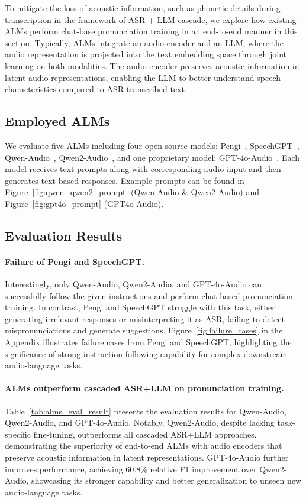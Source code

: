 \documentclass[11pt]{article}
\begin{document}
To mitigate the loss of acoustic information, such as phonetic details during transcription in the framework of ASR + LLM cascade, we explore how existing ALMs perform chat-base pronunciation training in an end-to-end manner in this section. Typically, ALMs integrate an audio encoder and an LLM, where the audio representation is projected into the text embedding space through joint learning on both modalities. The audio encoder preserves acoustic information in latent audio representations, enabling the LLM to better understand speech characteristics compared to ASR-transcribed text. 

\subsection{Employed ALMs}
We evaluate five ALMs including four open-source models: Pengi~\cite{pengi}, SpeechGPT~\cite{speechgpt}, Qwen-Audio~\cite{qwen-audio-1}, Qwen2-Audio~\cite{qwen-audio-2}, and one proprietary model: GPT-4o-Audio~\cite{gpt-4o}. Each model receives text prompts along with corresponding audio input and then generates text-based responses. Example prompts can be found in Figure~\ref{fig:qwen_qwen2_prompt} (Qwen-Audio \& Qwen2-Audio) and Figure~\ref{fig:gpt4o_prompt} (GPT4o-Audio).


\subsection{Evaluation Results} 

\paragraph{Failure of Pengi and SpeechGPT.} Interestingly, only Qwen-Audio, Qwen2-Audio, and GPT-4o-Audio can successfully follow the given instructions and perform chat-based pronunciation training. In contrast, Pengi and SpeechGPT struggle with this task, either generating irrelevant responses or misinterpreting it as ASR, failing to detect mispronunciations and generate suggestions. Figure~\ref{fig:failure_cases} in the Appendix illustrates failure cases from Pengi and SpeechGPT, highlighting the significance of strong instruction-following capability for complex downstream audio-language tasks.


\paragraph{ALMs outperform cascaded ASR+LLM on pronunciation training.} Table~\ref{tab:alms_eval_result} presents the evaluation results for Qwen-Audio, Qwen2-Audio, and GPT-4o-Audio. Notably, Qwen2-Audio, despite lacking task-specific fine-tuning, outperforms all cascaded ASR+LLM approaches, demonstrating the superiority of end-to-end ALMs with audio encoders that preserve acoustic information in latent representations. GPT-4o-Audio further improves performance, achieving $60.8\%$ relative F1 improvement over Qwen2-Audio, showcasing its stronger capability and better generalization to unseen new audio-language tasks. 
\end{document}
